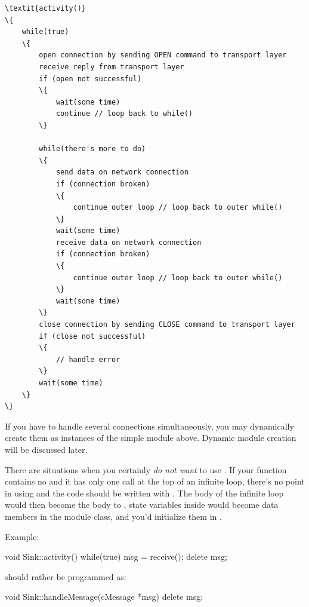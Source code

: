 \begin{Verbatim}[commandchars=\\\{\}]
\textit{activity()}
\{
    while(true)
    \{
        open connection by sending OPEN command to transport layer
        receive reply from transport layer
        if (open not successful)
        \{
            wait(some time)
            continue // loop back to while()
        \}

        while(there's more to do)
        \{
            send data on network connection
            if (connection broken)
            \{
                continue outer loop // loop back to outer while()
            \}
            wait(some time)
            receive data on network connection
            if (connection broken)
            \{
                continue outer loop // loop back to outer while()
            \}
            wait(some time)
        \}
        close connection by sending CLOSE command to transport layer
        if (close not successful)
        \{
            // handle error
        \}
        wait(some time)
    \}
\}
\end{Verbatim}

If you have to handle several connections simultaneously, you may
dynamically create them as instances of the simple module above.
Dynamic module creation will be discussed later.

There are situations when you certainly \textit{do not want} to use .
If your  function contains no  and it has
only one  call at the top of an infinite loop,
there's no point in using  and the code should be written
with .
The body of the infinite loop would then become the body to ,
state variables inside  would become data members in
the module class, and you'd initialize them in .

Example:

\begin{cpp}
void Sink::activity()
{
    while(true)
    {
        msg = receive();
        delete msg;
    }
}
\end{cpp}

should rather be programmed as:

\begin{cpp}
void Sink::handleMessage(cMessage *msg)
{
    delete msg;
}
\end{cpp}



